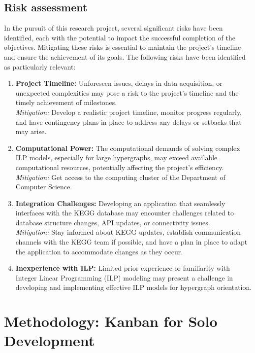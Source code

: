 \subsection{Risk assessment}
In the pursuit of this research project, several significant risks have been identified, each with the potential to impact the successful completion of the objectives. Mitigating these risks is essential to maintain the project's timeline and ensure the achievement of its goals. The following risks have been identified as particularly relevant:
\begin{enumerate}
    \item \textbf{Project Timeline:} Unforeseen issues, delays in data acquisition, or unexpected complexities may pose a risk to the project's timeline and the timely achievement of milestones.\\
        \textit{Mitigation:} Develop a realistic project timeline, monitor progress regularly, and have contingency plans in place to address any delays or setbacks that may arise.
    
    \item \textbf{Computational Power:} The computational demands of solving complex ILP models, especially for large hypergraphs, may exceed available computational resources, potentially affecting the project's efficiency.\\
        \textit{Mitigation:} Get access to the computing cluster of the Department of Computer Science.
    
    \item \textbf{Integration Challenges:} Developing an application that seamlessly interfaces with the KEGG database may encounter challenges related to database structure changes, API updates, or connectivity issues.\\
        \textit{Mitigation:} Stay informed about KEGG updates, establish communication channels with the KEGG team if possible, and have a plan in place to adapt the application to accommodate changes as they occur.
    
    \item \textbf{Inexperience with ILP:} Limited prior experience or familiarity with Integer Linear Programming (ILP) modeling may present a challenge in developing and implementing effective ILP models for hypergraph orientation.
\end{enumerate}

\section{Methodology: Kanban for Solo Development} \label{sec:Methodology}


